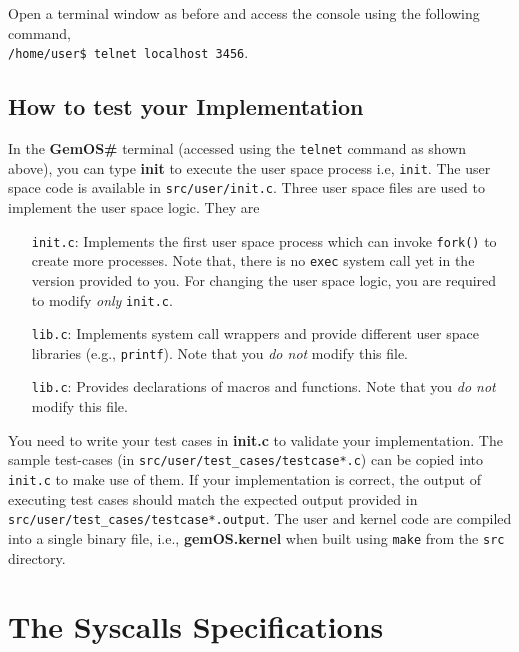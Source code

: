 \documentclass[12pt]{article}
\begin{document}
{\noindent
Open a terminal window as before and access the console using the following command, \\

\noindent
\texttt{/home/user\$ telnet localhost 3456}.

\subsection{How to test your Implementation}

In the \textbf{GemOS\#} terminal (accessed using the {\tt telnet} command as shown above),
you can type \textbf{init} to execute the user space process i.e, {\tt init}. 
The user space code is available in {\tt src/user/init.c}. Three user space files are used to implement the
user space logic. They are
\begin{itemize}
    \item[{\tt init.c}:] Implements the first user space process which can invoke {\tt fork()} to create more processes. Note that, there
    is no {\tt exec} system call yet in the version provided to you. For changing the user space logic, you are required to modify {\em only} 
    {\tt init.c}.
\item[{\tt lib.c}:] Implements system call wrappers and provide different user space libraries (e.g., {\tt printf}). 
    Note that you {\em do not} modify this file.
\item[{\tt lib.c}:] Provides declarations of macros and functions.
    Note that you {\em do not} modify this file.
\end{itemize}

You need to write your test cases in \textbf{init.c} to validate your implementation. The sample test-cases (in {\tt src/user/test\_cases/testcase*.c})
can be copied into {\tt init.c} to make use of them. If your implementation is correct, the output of executing test cases should match the 
expected output provided in {\tt src/user/test\_cases/testcase*.output}. 
The user and kernel code are compiled into a single binary file, i.e., \textbf{gemOS.kernel} when built using {\tt make} from 
the {\tt src} directory.
}
\section*{The Syscalls Specifications}

\end{document}
